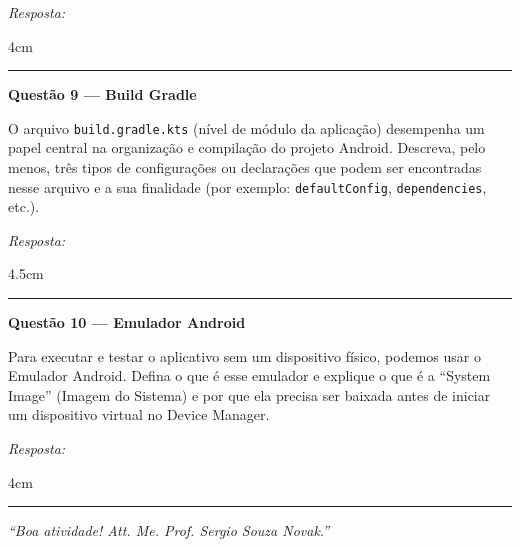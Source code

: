 \documentclass[12pt]{article}
\begin{document}
\vspace{0.3cm}
\noindent\textit{Resposta:}
\begin{resposta}{4cm}
\end{resposta}

\vspace{0.6cm}
\noindent\rule{\textwidth}{0.8pt}
\vspace{0.3cm}

\noindent\textbf{Questão 9 — Build Gradle}

\vspace{0.2cm}
\noindent
O arquivo \texttt{build.gradle.kts} (nível de módulo da aplicação) desempenha um papel central na organização e compilação do projeto Android. Descreva, pelo menos, três tipos de configurações ou declarações que podem ser encontradas nesse arquivo e a sua finalidade (por exemplo: \texttt{defaultConfig}, \texttt{dependencies}, etc.).

\vspace{0.3cm}
\noindent\textit{Resposta:}
\begin{resposta}{4.5cm}
\end{resposta}

\vspace{0.6cm}
\noindent\rule{\textwidth}{0.8pt}
\vspace{0.3cm}

\noindent\textbf{Questão 10 — Emulador Android}

\vspace{0.2cm}
\noindent
Para executar e testar o aplicativo sem um dispositivo físico, podemos usar o Emulador Android. Defina o que é esse emulador e explique o que é a ``System Image'' (Imagem do Sistema) e por que ela precisa ser baixada antes de iniciar um dispositivo virtual no Device Manager.

\vspace{0.3cm}
\noindent\textit{Resposta:}
\begin{resposta}{4cm}
\end{resposta}

\vspace{0.6cm}
\noindent\rule{\textwidth}{0.8pt}
\vspace{0.5cm}

\begin{center}
  \textit{``Boa atividade! Att. Me. Prof. Sergio Souza Novak.''}
\end{center}


\end{document}
